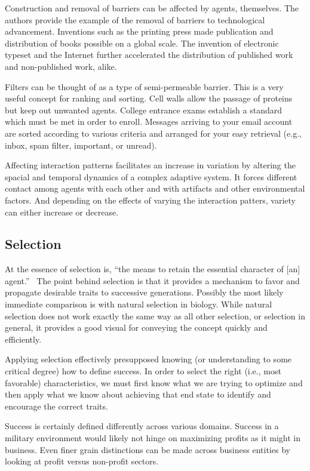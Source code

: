 \documentclass[jou,apacite]{apa6}
\begin{document}
Construction and removal of barriers can be affected by agents, themselves.  The authors provide the example of the removal of barriers to technological advancement.  Inventions such as the printing press made publication and distribution of books possible on a global scale.  The invention of electronic typeset and the Internet further accelerated the distribution of published work and non-published work, alike.

Filters can be thought of as a type of semi-permeable barrier.  This is a very useful concept for ranking and sorting.  Cell walls allow the passage of proteins but keep out unwanted agents.  College entrance exams establish a standard which must be met in order to enroll.  Messages arriving to your email account are sorted according to various criteria and arranged for your easy retrieval (e.g., inbox, spam filter, important, or unread).

Affecting interaction patterns facilitates an increase in variation by altering the spacial and temporal dynamics of a complex adaptive system.  It forces different contact among agents with each other and with artifacts and other environmental factors.  And depending on the effects of varying the interaction patters, variety can either increase or decrease.

\subsection{Selection}
At the essence of selection is, ``the means to retain the essential character of [an] agent.''~\cite[page 117]{Axelrod}  The point behind selection is that it provides a mechanism to favor and propagate desirable traits to successive generations.  Possibly the most likely immediate comparison is with natural selection in biology.  While natural selection does not work exactly the same way as all other selection, or selection in general, it provides a good visual for
conveying the concept quickly and efficiently.

Applying selection effectively presupposed knowing (or understanding to some critical degree) how to define success.  In order to select the right (i.e., most favorable) characteristics, we must first know what we are trying to optimize and then apply what we know about achieving that end state to identify and encourage the correct traits.

Success is certainly defined differently across various domains.  Success in a military environment would likely not hinge on maximizing profits as it might in business.  Even finer grain distinctions can be made across business entities by looking at profit versus non-profit sectors.
\end{document}
